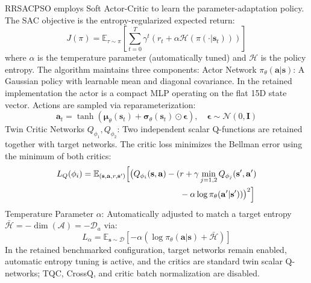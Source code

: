 \documentclass[final,5p,times]{elsarticle}
\newcommand{\symActiondim}{\mathcal{D}_a}
\newcommand{\symGamma}{\gamma}
\begin{document}
RRSACPSO employs Soft Actor-Critic \cite{Haarnoja2018Soft} to learn the parameter-adaptation policy.
The SAC objective is the entropy-regularized expected return:
\begin{equation}
J(\pi) = \mathbb{E}_{\tau \sim \pi}\left[\sum_{t=0}^{T} \gamma^t \left(r_t + \alpha \mathcal{H}(\pi(\cdot|\mathbf{s}_t))\right)\right]
\label{eq:sac_objective}
\end{equation} where $\alpha$ is the temperature parameter (automatically tuned) and $\mathcal{H}$ is the policy entropy.
The algorithm maintains three components: Actor Network $\pi_\theta(\mathbf{a}|\mathbf{s})$: A Gaussian policy with learnable mean and diagonal covariance. In the retained implementation the actor is a compact MLP operating on the flat 15D state vector. Actions are sampled via reparameterization:
\begin{equation}
\mathbf{a}_t = \tanh(\boldsymbol{\mu}_\theta(\mathbf{s}_t) + \boldsymbol{\sigma}_\theta(\mathbf{s}_t) \odot \boldsymbol{\epsilon}), \quad \boldsymbol{\epsilon} \sim \mathcal{N}(0, \mathbf{I})
\end{equation} Twin Critic Networks $Q_{\phi_1}, Q_{\phi_2}$: Two independent scalar Q-functions are retained together with target networks. The critic loss minimizes the Bellman error using the minimum of both critics:
\begin{equation}
\begin{aligned}
L_Q(\phi_i) = \mathbb{E}_{(\mathbf{s},\mathbf{a},r,\mathbf{s}')} \Bigl[ \bigl(Q_{\phi_i}(\mathbf{s}, \mathbf{a}) - (&r + \symGamma \min_{j=1,2} Q_{\phi_j}(\mathbf{s}', \mathbf{a}') \\
&- \alpha \log \pi_\theta(\mathbf{a}'|\mathbf{s}') )\bigr)^2 \Bigr]
\end{aligned}
\end{equation} Temperature Parameter $\alpha$: Automatically adjusted to match a target entropy $\bar{\mathcal{H}} = -\dim(\mathcal{A}) = -\symActiondim$ via:
\begin{equation}
L_\alpha = \mathbb{E}_{\mathbf{s} \sim \mathcal{D}}\left[-\alpha \left(\log \pi_\theta(\mathbf{a}|\mathbf{s}) + \bar{\mathcal{H}}\right)\right]
\end{equation} In the retained benchmarked configuration, target networks remain enabled, automatic entropy tuning is active, and the critics are standard twin scalar Q-networks; TQC, CrossQ, and critic batch normalization are disabled.
\end{document}
